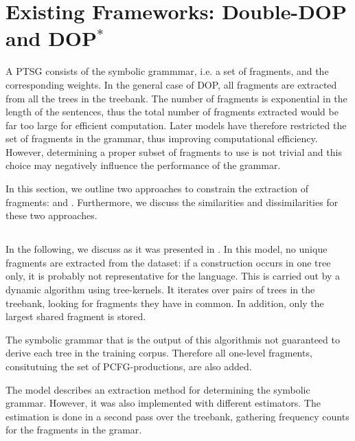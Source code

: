 
\section{Existing Frameworks: Double-DOP and DOP$^*$}

A PTSG consists of the symbolic grammmar, i.e. a set of fragments, and the corresponding weights. In the general case of DOP, all fragments are extracted from all the trees in the treebank. The number of fragments is exponential in the length of the sentences, thus the total number of fragments extracted would be far too large for efficient computation. 
Later models have therefore restricted the set of fragments in the grammar, thus improving computational efficiency. However, determining a proper subset of fragments to use is not trivial and this choice may negatively influence the performance of the grammar.


In this section, we outline two approaches to constrain the extraction of fragments: \ddop and \dops. Furthermore, we discuss the similarities and dissimilarities for these two approaches. 

\subsection{\ddop}
In the following, we discuss \ddop{} as it was presented in \cite{sangati2011}. In this model, no unique fragments are extracted from the dataset: if a construction occurs in one tree only, it is probably not representative for the language. This is carried out by a dynamic algorithm using tree-kernels. It iterates over pairs of trees in the treebank, looking for fragments they have in common. In addition, only the largest shared fragment is stored. 

The symbolic grammar that is the output of this algorithmis not guaranteed to derive each tree in the training corpus. Therefore all one-level fragments, consitutuing the set of PCFG-productions, are also added.

The \ddop{} model describes an extraction method for determining the symbolic grammar. However, it was also implemented with different estimators. The estimation is done in a second pass over the treebank, gathering frequency counts for the fragments in the gramar. 

